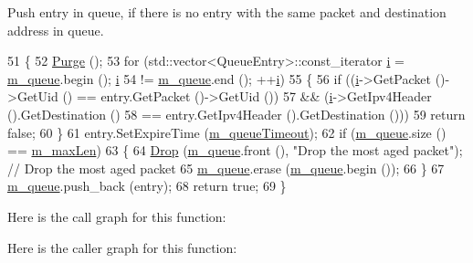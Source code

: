 Push entry in queue, if there is no entry with the same packet and destination address in queue. 


\begin{DoxyCode}
51 \{
52   \hyperlink{classns3_1_1aodv_1_1RequestQueue_a6ed74cff072d572de14a87a5aaef2831}{Purge} ();
53   \textcolor{keywordflow}{for} (std::vector<QueueEntry>::const\_iterator \hyperlink{bernuolliDistribution_8m_a6f6ccfcf58b31cb6412107d9d5281426}{i} = \hyperlink{classns3_1_1aodv_1_1RequestQueue_a82316614d880a232fd2ad5fc2067088a}{m\_queue}.begin (); \hyperlink{bernuolliDistribution_8m_a6f6ccfcf58b31cb6412107d9d5281426}{i}
54        != \hyperlink{classns3_1_1aodv_1_1RequestQueue_a82316614d880a232fd2ad5fc2067088a}{m\_queue}.end (); ++\hyperlink{bernuolliDistribution_8m_a6f6ccfcf58b31cb6412107d9d5281426}{i})
55     \{
56       \textcolor{keywordflow}{if} ((\hyperlink{bernuolliDistribution_8m_a6f6ccfcf58b31cb6412107d9d5281426}{i}->GetPacket ()->GetUid () == entry.GetPacket ()->GetUid ())
57           && (\hyperlink{bernuolliDistribution_8m_a6f6ccfcf58b31cb6412107d9d5281426}{i}->GetIpv4Header ().GetDestination ()
58               == entry.GetIpv4Header ().GetDestination ()))
59         \textcolor{keywordflow}{return} \textcolor{keyword}{false};
60     \}
61   entry.SetExpireTime (\hyperlink{classns3_1_1aodv_1_1RequestQueue_aa6026890dfa99e5104d035cf9aedbc28}{m\_queueTimeout});
62   \textcolor{keywordflow}{if} (\hyperlink{classns3_1_1aodv_1_1RequestQueue_a82316614d880a232fd2ad5fc2067088a}{m\_queue}.size () == \hyperlink{classns3_1_1aodv_1_1RequestQueue_a1d6c29b548a3a63d4702e6f1b62e08ae}{m\_maxLen})
63     \{
64       \hyperlink{classns3_1_1aodv_1_1RequestQueue_af39cbe0d1f9ed4cbe14355b6a3b594e6}{Drop} (\hyperlink{classns3_1_1aodv_1_1RequestQueue_a82316614d880a232fd2ad5fc2067088a}{m\_queue}.front (), \textcolor{stringliteral}{"Drop the most aged packet"}); \textcolor{comment}{// Drop the most aged packet}
65       \hyperlink{classns3_1_1aodv_1_1RequestQueue_a82316614d880a232fd2ad5fc2067088a}{m\_queue}.erase (\hyperlink{classns3_1_1aodv_1_1RequestQueue_a82316614d880a232fd2ad5fc2067088a}{m\_queue}.begin ());
66     \}
67   \hyperlink{classns3_1_1aodv_1_1RequestQueue_a82316614d880a232fd2ad5fc2067088a}{m\_queue}.push\_back (entry);
68   \textcolor{keywordflow}{return} \textcolor{keyword}{true};
69 \}
\end{DoxyCode}


Here is the call graph for this function\+:




Here is the caller graph for this function\+:


